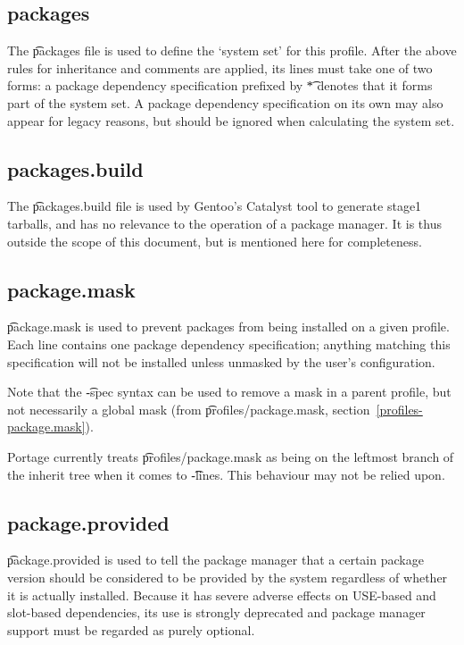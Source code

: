 \subsection{packages}
The \t{packages} file is used to define the `system set' for this profile.
After the above rules for inheritance and comments are applied, its lines must take one of two
forms: a package dependency specification prefixed by \t{*} denotes that it forms part of the
system set. A package dependency specification on its own may also appear for legacy reasons, but
should be ignored when calculating the system set.

\subsection{packages.build}
The \t{packages.build} file is used by Gentoo's Catalyst tool to generate stage1 tarballs, and has
no relevance to the operation of a package manager. It is thus outside the scope of this document,
but is mentioned here for completeness.

\subsection{package.mask}
\t{package.mask} is used to prevent packages from being installed on a given profile. Each line
contains one package dependency specification; anything matching this specification will not be
installed unless unmasked by the user's configuration.

Note that the \t{-spec} syntax can be used to remove a mask in a parent profile, but not
necessarily a global mask (from \t{profiles/package.mask}, section~\ref{profiles-package.mask}).

\note Portage currently treats \t{profiles/package.mask} as being on the leftmost branch of the
    inherit tree when it comes to \t{-lines}. This behaviour may not be relied upon.

\subsection{package.provided}
\t{package.provided} is used to tell the package manager that a certain package version should be
considered to be provided by the system regardless of whether it is actually installed. Because it
has severe adverse effects on USE-based and slot-based dependencies, its use is strongly deprecated
and package manager support must be regarded as purely optional.

